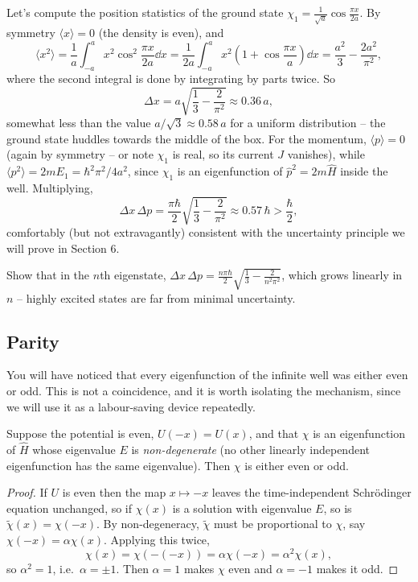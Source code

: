 \documentclass[a4paper]{scrartcl}
\begin{document}
\begin{example}
    Let's compute the position statistics of the ground state $\chi_1 = \frac{1}{\sqrt{a}}\cos\frac{\pi x}{2a}$. By symmetry $\langle x \rangle = 0$ (the density is even), and
    $$
    \langle x^2 \rangle = \frac{1}{a} \int_{-a}^{a} x^2 \cos^2 \frac{\pi x}{2 a} \dd x
    = \frac{1}{2a}\int_{-a}^{a} x^2 \left( 1 + \cos \frac{\pi x}{a} \right) \dd x
    = \frac{a^2}{3} - \frac{2 a^2}{\pi^2},
    $$
    where the second integral is done by integrating by parts twice. So
    $$
    \Delta x = a \sqrt{\frac{1}{3} - \frac{2}{\pi^2}} \approx 0.36 \, a,
    $$
    somewhat less than the value $a/\sqrt{3} \approx 0.58 \, a$ for a uniform distribution -- the ground state huddles towards the middle of the box. For the momentum, $\langle p \rangle = 0$ (again by symmetry -- or note $\chi_1$ is real, so its current $J$ vanishes), while $\langle p^2 \rangle = 2m E_1 = \hbar^2 \pi^2/4a^2$, since $\chi_1$ is an eigenfunction of $\hat{p}^2 = 2m\hat{H}$ inside the well. Multiplying,
    $$
    \Delta x \, \Delta p = \frac{\pi \hbar}{2} \sqrt{\frac{1}{3} - \frac{2}{\pi^2}} \approx 0.57 \, \hbar > \frac{\hbar}{2},
    $$
    comfortably (but not extravagantly) consistent with the uncertainty principle we will prove in Section 6.
\end{example}

\begin{exercise}
    Show that in the $n$th eigenstate, $\Delta x \, \Delta p = \frac{n \pi \hbar}{2}\sqrt{\frac{1}{3} - \frac{2}{n^2\pi^2}}$, which grows linearly in $n$ -- highly excited states are far from minimal uncertainty.
\end{exercise}

\subsection{Parity}

You will have noticed that every eigenfunction of the infinite well was either even or odd. This is not a coincidence, and it is worth isolating the mechanism, since we will use it as a labour-saving device repeatedly.

\begin{proposition}
    Suppose the potential is even, $U(-x) = U(x)$, and that $\chi$ is an eigenfunction of $\hat{H}$ whose eigenvalue $E$ is \emph{non-degenerate} (no other linearly independent eigenfunction has the same eigenvalue). Then $\chi$ is either even or odd.
\end{proposition}
\begin{proof}
    If $U$ is even then the map $x \mapsto -x$ leaves the time-independent Schr\"odinger equation unchanged, so if $\chi(x)$ is a solution with eigenvalue $E$, so is $\tilde{\chi}(x) = \chi(-x)$. By non-degeneracy, $\tilde{\chi}$ must be proportional to $\chi$, say $\chi(-x) = \alpha \chi(x)$. Applying this twice,
    $$
    \chi(x) = \chi(-(-x)) = \alpha \chi(-x) = \alpha^2 \chi(x),
    $$
    so $\alpha^2 = 1$, i.e.\ $\alpha = \pm 1$. Then $\alpha = 1$ makes $\chi$ even and $\alpha = -1$ makes it odd.
\end{proof}
\end{document}
